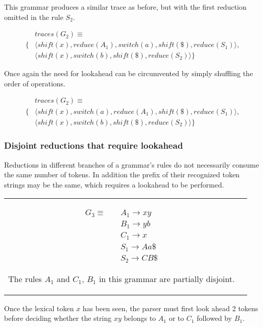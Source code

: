 \documentclass[a4paper,11pt]{article}
\begin{document}
This grammar produces a similar trace as before, but with the first reduction omitted in the rule $S_2$.

\parbox{.3\textwidth}{\begin{align*}
&traces(G_2) \equiv \\
\{ & \langle shift(x), reduce(A_1), switch(a), shift(\$), reduce(S_1) \rangle,\\
   & \langle shift(x), switch(b), shift(\$), reduce(S_2) \rangle \}
\end{align*}}

Once again the need for lookahead can be circumvented by simply shuffling the order of operations.

\parbox{.3\textwidth}{\begin{align*}
&traces(G_2) \equiv \\
\{ & \langle shift(x), switch(a), reduce(A_1), shift(\$), reduce(S_1) \rangle,\\
   & \langle shift(x), switch(b), shift(\$), reduce(S_2) \rangle \}
\end{align*}}

\subsubsection{Disjoint reductions that require lookahead}
Reductions in different branches of a grammar's rules do not necessarily consume the same number of tokens. 
In addition the prefix of their recognized token strings may be the same, which requires a lookahead to be performed.\\
\begin{tabular}[t]{cl}
\parbox{.3\textwidth}{
\begin{align*}
G_3 \equiv \quad & A_1 \rightarrow x y\\
                 & B_1 \rightarrow y b\\
                 & C_1 \rightarrow x\\
                 & S_1 \rightarrow A a \$\\
                 & S_2 \rightarrow C B \$
\end{align*}}
\parbox{.8\textwidth}{The rules $A_1$ and $C_1$, $B_1$ in this grammar are partially disjoint.}
\end{tabular}

Once the lexical token $x$ has been seen, the parser must first look ahead 2 tokens before 
deciding whether the string $x y$ belongs to $A_1$ or to $C_1$ followed by $B_1$.
\end{document}
